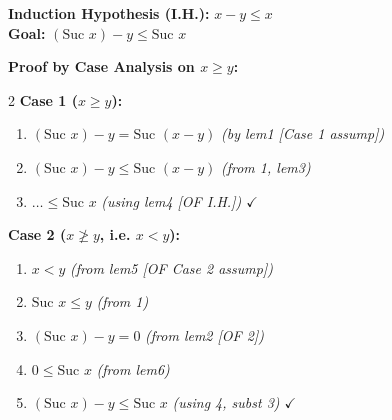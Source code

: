 \documentclass[10pt,a4paper]{article}
\begin{document}
\vspace{0.3em}

\begin{tcolorbox}[title={3. Step Case ($x \to \text{Suc } x$) with Case Analysis}]
\textbf{Induction Hypothesis (I.H.):} $x - y \le x$ \\
\textbf{Goal:} $(\text{Suc } x) - y \le \text{Suc } x$

\vspace{0.3em}
\textbf{Proof by Case Analysis on $x \ge y$:}

\begin{multicols}{2}
\textbf{Case 1 ($x \ge y$):}
\begin{enumerate}[leftmargin=1.2em, itemsep=2pt]
    \item $(\text{Suc } x) - y = \text{Suc } (x - y)$ \quad \textit{(by lem1 [Case 1 assump])}
    \item $(\text{Suc } x) - y \le \text{Suc } (x - y)$ \quad \textit{(from 1, lem3)}
    \item $\dots \le \text{Suc } x$ \quad \textit{(using lem4 [OF I.H.]) $\checkmark$}
\end{enumerate}

\columnbreak

\textbf{Case 2 ($x \ngeq y$, i.e. $x < y$):}
\begin{enumerate}[leftmargin=1.2em, itemsep=2pt]
    \item $x < y$ \quad \textit{(from lem5 [OF Case 2 assump])}
    \item $\text{Suc } x \le y$ \quad \textit{(from 1)}
    \item $(\text{Suc } x) - y = 0$ \quad \textit{(from lem2 [OF 2])}
    \item $0 \le \text{Suc } x$ \quad \textit{(from lem6)}
    \item $(\text{Suc } x) - y \le \text{Suc } x$ \quad \textit{(using 4, subst 3) $\checkmark$}
\end{enumerate}
\end{multicols}
\end{tcolorbox}

\vspace{0.3em}
\end{document}
